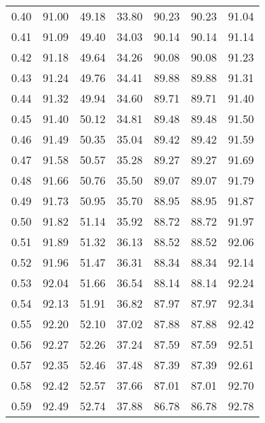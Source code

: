 \begin{tabular}{|c|c|c|c|c|c|c|}
      0.40 &     91.00 &     49.18 &      33.80 &   90.23 &      90.23 &         91.04 \\
      0.41 &     91.09 &     49.40 &      34.03 &   90.14 &      90.14 &         91.14 \\
      0.42 &     91.18 &     49.64 &      34.26 &   90.08 &      90.08 &         91.23 \\
      0.43 &     91.24 &     49.76 &      34.41 &   89.88 &      89.88 &         91.31 \\
      0.44 &     91.32 &     49.94 &      34.60 &   89.71 &      89.71 &         91.40 \\
      0.45 &     91.40 &     50.12 &      34.81 &   89.48 &      89.48 &         91.50 \\
      0.46 &     91.49 &     50.35 &      35.04 &   89.42 &      89.42 &         91.59 \\
      0.47 &     91.58 &     50.57 &      35.28 &   89.27 &      89.27 &         91.69 \\
      0.48 &     91.66 &     50.76 &      35.50 &   89.07 &      89.07 &         91.79 \\
      0.49 &     91.73 &     50.95 &      35.70 &   88.95 &      88.95 &         91.87 \\
      0.50 &     91.82 &     51.14 &      35.92 &   88.72 &      88.72 &         91.97 \\
      0.51 &     91.89 &     51.32 &      36.13 &   88.52 &      88.52 &         92.06 \\
      0.52 &     91.96 &     51.47 &      36.31 &   88.34 &      88.34 &         92.14 \\
      0.53 &     92.04 &     51.66 &      36.54 &   88.14 &      88.14 &         92.24 \\
      0.54 &     92.13 &     51.91 &      36.82 &   87.97 &      87.97 &         92.34 \\
      0.55 &     92.20 &     52.10 &      37.02 &   87.88 &      87.88 &         92.42 \\
      0.56 &     92.27 &     52.26 &      37.24 &   87.59 &      87.59 &         92.51 \\
      0.57 &     92.35 &     52.46 &      37.48 &   87.39 &      87.39 &         92.61 \\
      0.58 &     92.42 &     52.57 &      37.66 &   87.01 &      87.01 &         92.70 \\
      0.59 &     92.49 &     52.74 &      37.88 &   86.78 &      86.78 &         92.78 \\

\end{tabular}
